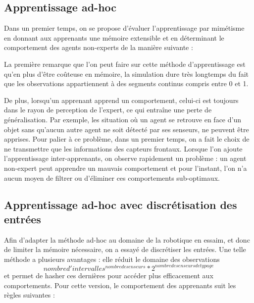 \documentclass[a4paper, 12pt]{report}
\begin{document}
	\subsection{Apprentissage ad-hoc}
	Dans un premier temps, on se propose d'évaluer l'apprentissage par mimétisme en donnant aux apprenants une mémoire extensible et en déterminant le comportement des agents non-experts de la manière suivante :

	
	La première remarque que l'on peut faire sur cette méthode d'apprentissage est qu'en plus d'être coûteuse en mémoire, la simulation dure très longtemps du fait que les observations appartiennent à des segments continus compris entre 0 et 1.
	
	De plus, lorsqu'un apprenant apprend un comportement, celui-ci est toujours dans le rayon de perception de l'expert, ce qui entraîne une perte de généralisation. Par exemple, les situation où un agent se retrouve en face d'un objet sans qu'aucun autre agent ne soit détecté par ses senseurs, ne peuvent être apprises.
	Pour palier à ce problème, dans un premier temps, on a fait le choix de ne transmettre que les informations des capteurs frontaux.
	Lorsque l'on ajoute l'apprentissage inter-apprenants, on observe rapidement un problème : un agent non-expert peut apprendre un mauvais comportement et pour l'instant, l'on n'a aucun moyen de filtrer ou d'éliminer ces comportements sub-optimaux.
	
	\subsection{Apprentissage ad-hoc avec discrétisation des entrées}
	Afin d'adapter la méthode ad-hoc au domaine de la robotique en essaim, et donc de limiter la mémoire nécessaire, on a essayé de discrétiser les entrées. Une telle méthode a plusieurs avantages : elle réduit le domaine des observations $$nombre d'intervalles^{nombre de senseurs}*2^{nombre de senseurs de typage} $$ et permet de hasher ces dernières pour accéder plus efficacement aux comportements.
	Pour cette version, le comportement des apprenants suit les règles suivantes :
	
\end{document}
